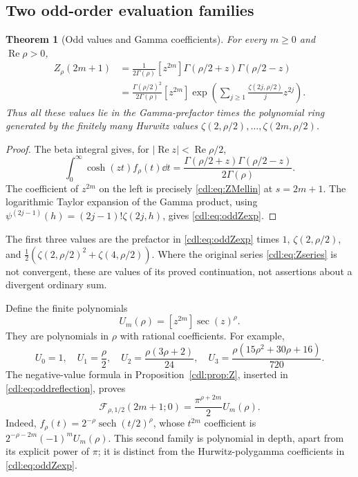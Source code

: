\documentclass[11pt,letterpaper]{article}
\numberwithin{equation}{section}
\newtheorem{theorem}{Theorem}[section]
\theoremstyle{definition}\newtheorem{definition}[theorem]{Definition}
\theoremstyle{remark}\newtheorem{remark}[theorem]{Remark}
\newcommand{\Rea}{\operatorname{Re}}\newcommand{\Ima}{\operatorname{Im}}
\newcommand{\F}{\mathcal F}\newcommand{\E}{\mathcal E}
\begin{document}
\subsection{Two odd-order evaluation families}
\begin{theorem}[Odd values and Gamma coefficients]\label{cdl:thm:oddZ}
For every $m\ge0$ and $\Rea\rho>0$,
\begin{align}
 Z_\rho(2m+1)
 &=\frac1{2\Gamma(\rho)}[z^{2m}]
   \Gamma(\rho/2+z)\Gamma(\rho/2-z)\label{cdl:eq:oddZ}\\
 &=\frac{\Gamma(\rho/2)^2}{2\Gamma(\rho)}[z^{2m}]
 \exp\left(\sum_{j\ge1}\frac{\zeta(2j,\rho/2)}jz^{2j}\right).
 \label{cdl:eq:oddZexp}
\end{align}
Thus all these values lie in the Gamma-prefactor times the polynomial
ring generated by the finitely many Hurwitz values
$\zeta(2,\rho/2),\ldots,\zeta(2m,\rho/2)$.
\end{theorem}
\begin{proof}
The beta integral gives, for $|\Rea z|<\Rea\rho/2$,
\[
 \int_0^\infty\cosh(zt)f_\rho(t)\dd t
 =\frac{\Gamma(\rho/2+z)\Gamma(\rho/2-z)}{2\Gamma(\rho)}.
\]
The coefficient of $z^{2m}$ on the left is precisely
\eqref{cdl:eq:ZMellin} at $s=2m+1$. The logarithmic Taylor expansion
of the Gamma product, using
$\psi^{(2j-1)}(h)=(2j-1)!\zeta(2j,h)$, gives
\eqref{cdl:eq:oddZexp}.
\end{proof}

The first three values are the prefactor in \eqref{cdl:eq:oddZexp}
times $1$, $\zeta(2,\rho/2)$, and
$\tfrac12(\zeta(2,\rho/2)^2+\zeta(4,\rho/2))$.
Where the original series \eqref{cdl:eq:Zseries} is not convergent,
these are values of its proved continuation, not assertions about a
divergent ordinary sum.

Define the finite polynomials
\begin{equation}\label{cdl:eq:Emompoly}
 U_m(\rho)=[z^{2m}]\sec(z)^\rho.
\end{equation}
They are polynomials in $\rho$ with rational coefficients. For example,
\begin{equation}\label{cdl:eq:Umexamples}
 U_0=1,\quad U_1=\frac\rho2,\quad
 U_2=\frac{\rho(3\rho+2)}{24},\quad
 U_3=\frac{\rho(15\rho^2+30\rho+16)}{720}.
\end{equation}
The negative-value formula in Proposition~\ref{cdl:prop:Z}, inserted
in \eqref{cdl:eq:oddreflection}, proves
\begin{equation}\label{cdl:eq:oddF}
 \boxed{\displaystyle
 \F_{\rho,1/2}(2m+1;0)=\frac{\pi^{\rho+2m}}2U_m(\rho).}
\end{equation}
Indeed,
$f_\rho(t)=2^{-\rho}\operatorname{sech}(t/2)^\rho$, whose $t^{2m}$
coefficient is $2^{-\rho-2m}(-1)^mU_m(\rho)$.
This second family is polynomial in depth, apart from its explicit
power of $\pi$; it is distinct from the Hurwitz-polygamma coefficients
in \eqref{cdl:eq:oddZexp}.
\end{document}
